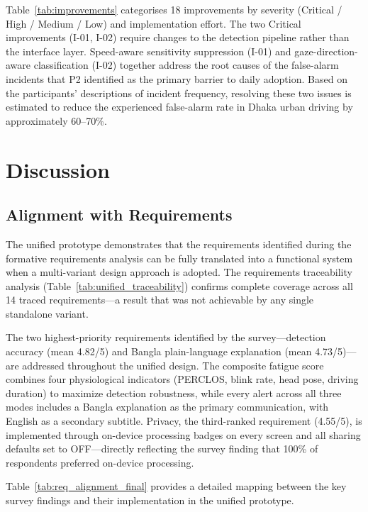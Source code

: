 \documentclass[sigconf]{acmart}
\begin{document}
Table~\ref{tab:improvements} categorises 18 improvements by severity (Critical / High / Medium / Low) and implementation effort. The two Critical improvements (I-01, I-02) require changes to the detection pipeline rather than the interface layer. Speed-aware sensitivity suppression (I-01) and gaze-direction-aware classification (I-02) together address the root causes of the false-alarm incidents that P2 identified as the primary barrier to daily adoption. Based on the participants' descriptions of incident frequency, resolving these two issues is estimated to reduce the experienced false-alarm rate in Dhaka urban driving by approximately 60--70\%.


\section{Discussion}

\subsection{Alignment with Requirements}

The unified prototype demonstrates that the requirements identified during the formative requirements analysis can be fully translated into a functional system when a multi-variant design approach is adopted. The requirements traceability analysis (Table~\ref{tab:unified_traceability}) confirms complete coverage across all 14 traced requirements---a result that was not achievable by any single standalone variant.

The two highest-priority requirements identified by the survey---detection accuracy (mean 4.82/5) and Bangla plain-language explanation (mean 4.73/5)---are addressed throughout the unified design. The composite fatigue score combines four physiological indicators (PERCLOS, blink rate, head pose, driving duration) to maximize detection robustness, while every alert across all three modes includes a Bangla explanation as the primary communication, with English as a secondary subtitle. Privacy, the third-ranked requirement (4.55/5), is implemented through on-device processing badges on every screen and all sharing defaults set to OFF---directly reflecting the survey finding that 100\% of respondents preferred on-device processing.

Table~\ref{tab:req_alignment_final} provides a detailed mapping between the key survey findings and their implementation in the unified prototype.
\end{document}
